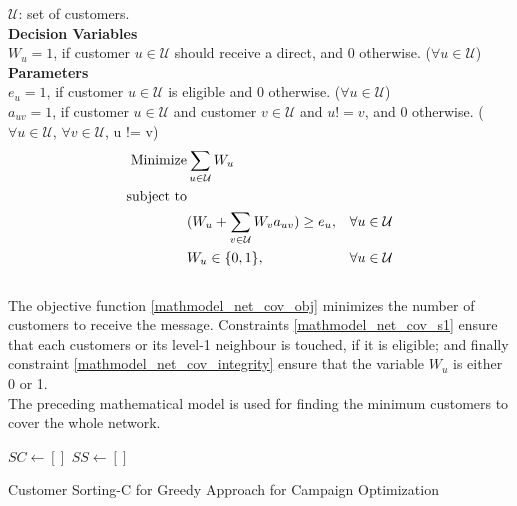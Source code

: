 \documentclass[11pt]{article}
\begin{document}
\noindent ${\mathcal{U}}$: set of customers. \\

\noindent \textbf{Decision Variables}\\

\noindent $W_{u}=1$, if customer $u \in \mathcal{U}$ should receive a direct, and 0 otherwise.
($\forall u \in \mathcal{U}$)\\

\noindent \textbf{Parameters}\\

\noindent $e_{u}=1$, if customer $u \in \mathcal{U}$ is eligible and 0 otherwise.
($\forall u \in \mathcal{U}$)\\

\noindent $a_{{u}{v}}=1$, if customer $u \in \mathcal{U}$ and customer $v \in \mathcal{U}$ and $u != v$, and 0 otherwise.
($\forall u \in \mathcal{U}$, $\forall v \in \mathcal{U}$, u != v)\\

\begin{align}
\text{Minimize} & \displaystyle
\sum\limits_{u\in \mathcal{U}}
W_{u} \label{mathmodel_net_cov_obj}&
\\
\text{subject to} \notag\\
&(W_{u}+\sum\limits_{v\in\mathcal{U}}W_{v}a_{{u}{v}}) \geq e_{u},&\forall u \in \mathcal{U} \label{mathmodel_net_cov_s1}
\\
&W_{u} \in \{0,1\},&\forall u \in \mathcal{U} \label{mathmodel_net_cov_integrity}
\end{align}\\

The objective function \eqref{mathmodel_net_cov_obj} minimizes the number of customers to receive the message. Constraints \eqref{mathmodel_net_cov_s1} ensure that each customers or its level-1 neighbour is touched, if it is eligible; and finally constraint \eqref{mathmodel_net_cov_integrity} ensure that the variable $W_{u}$ is either 0 or 1.\\

The preceding mathematical model is used for finding the minimum  customers to cover the whole network.

\begin{algorithm}[H]
\State $SC \gets []$\;
\State $SS \gets []$\;

\EndFor
{}
\caption{Customer Sorting-C for Greedy Approach for Campaign Optimization}
\label{algo:cust-sort-c}
\end{algorithm}
\end{document}
